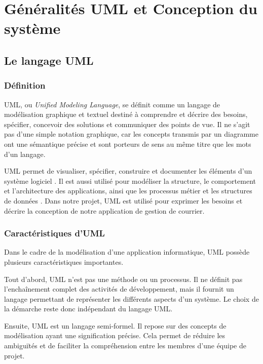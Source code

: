 \chapter{Généralités UML et Conception du système}
\label{chap:conception}

\section{Le langage UML}
\label{sec:langage_uml}

\subsection{Définition}
\label{subsec:definition_uml}

UML, ou \textit{Unified Modeling Language}, se définit comme un langage de modélisation graphique et textuel destiné à comprendre et décrire des besoins, spécifier, concevoir des solutions et communiquer des points de vue. Il ne s’agit pas d’une simple notation graphique, car les concepts transmis par un diagramme ont une sémantique précise et sont porteurs de sens au même titre que les mots d’un langage.

UML permet de visualiser, spécifier, construire et documenter les éléments d’un système logiciel \cite{omg_uml_spec}. Il est aussi utilisé pour modéliser la structure, le comportement et l’architecture des applications, ainsi que les processus métier et les structures de données \cite{omg_uml}. Dans notre projet, UML est utilisé pour exprimer les besoins et décrire la conception de notre application de gestion de courrier.

\subsection{Caractéristiques d’UML}
\label{subsec:caracteristiques_uml}

Dans le cadre de la modélisation d’une application informatique, UML possède plusieurs caractéristiques importantes.

Tout d’abord, UML n’est pas une méthode ou un processus. Il ne définit pas l’enchaînement complet des activités de développement, mais il fournit un langage permettant de représenter les différents aspects d’un système. Le choix de la démarche reste donc indépendant du langage UML.

Ensuite, UML est un langage semi-formel. Il repose sur des concepts de modélisation ayant une signification précise. Cela permet de réduire les ambiguïtés et de faciliter la compréhension entre les membres d’une équipe de projet.

